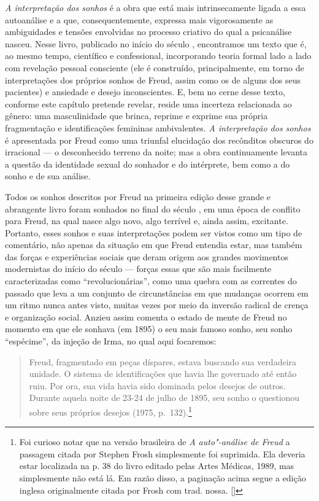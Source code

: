 \emph{A interpretação dos sonhos} é a obra que está mais intrinsecamente
ligada a essa autoanálise e a que, consequentemente, expressa mais
vigorosamente as ambiguidades e tensões envolvidas no processo criativo
do qual a psicanálise nasceu. Nesse livro, publicado no início do século
, encontramos um texto que é, ao mesmo tempo, científico e
confessional, incorporando teoria formal lado a lado com revelação
pessoal consciente (ele é construído, principalmente, em torno de
interpretações dos próprios sonhos de Freud, assim como os de alguns dos
seus pacientes) e ansiedade e desejo inconscientes. E, bem no cerne
desse texto, conforme este capítulo pretende revelar, reside uma
incerteza relacionada ao gênero: uma masculinidade que brinca, reprime e
exprime sua própria fragmentação e identificações femininas
ambivalentes. \emph{A interpretação dos sonhos} é apresentada por Freud
como uma triunfal elucidação dos recônditos obscuros do irracional --- o
desconhecido terreno da noite; mas a obra continuamente levanta a
questão da identidade sexual do sonhador e do intérprete, bem como a do
sonho e de sua análise.

Todos os sonhos descritos por Freud na primeira edição desse grande e
abrangente livro foram sonhados no final do século , em uma época de
conflito para Freud, na qual nasce algo novo, algo terrível e, ainda
assim, excitante. Portanto, esses sonhos e suas interpretações podem ser
vistos como um tipo de comentário, não apenas da situação em que Freud
entendia estar, mas também das forças e experiências sociais que deram
origem aos grandes movimentos modernistas do início do século  ---
forças essas que são mais facilmente caracterizadas como
``revolucionárias'', como uma quebra com as correntes do passado que
leva a um conjunto de circunstâncias em que mudanças ocorrem em um ritmo
nunca antes visto, muitas vezes por meio da inversão radical de crença e
organização social. Anzieu assim comenta o estado de mente de
Freud no momento em que ele sonhava (em 1895) o seu mais famoso sonho,
seu sonho ``espécime'', da injeção de Irma, no qual aqui focaremos:

\begin{quote}
Freud, fragmentado em peças díspares, estava buscando sua verdadeira
unidade. O sistema de identificações que havia lhe governado até então
ruiu. Por ora, sua vida havia sido dominada pelos desejos de outros.
Durante aquela noite de 23-24 de julho de 1895, seu sonho o questionou
sobre seus próprios desejos (1975, p.~132).\footnote{Foi curioso notar que na
  versão brasileira de \emph{A auto"-análise de Freud} a passagem citada por
  Stephen Frosh simplesmente foi suprimida. Ela deveria estar localizada
  na p. 38 do livro editado pelas Artes Médicas, 1989, mas simplesmente
  não está lá. Em razão disso, a paginação acima segue a edição inglesa
  originalmente citada por Frosh com trad. nossa. []}
\end{quote}

